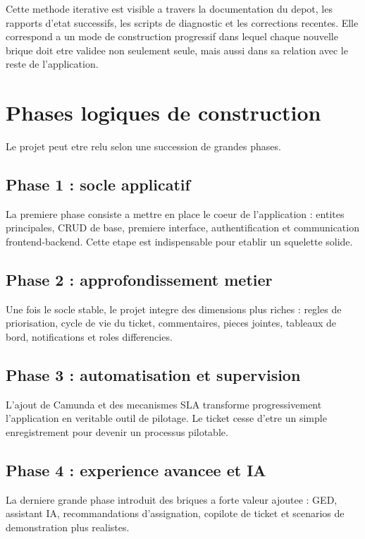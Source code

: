 \documentclass[12pt,a4paper,oneside]{report}
\begin{document}
Cette methode iterative est visible a travers la documentation du depot, les rapports d'etat successifs, les scripts de diagnostic et les corrections recentes. Elle correspond a un mode de construction progressif dans lequel chaque nouvelle brique doit etre validee non seulement seule, mais aussi dans sa relation avec le reste de l'application.

\section{Phases logiques de construction}

Le projet peut etre relu selon une succession de grandes phases.

\subsection{Phase 1 : socle applicatif}

La premiere phase consiste a mettre en place le coeur de l'application : entites principales, CRUD de base, premiere interface, authentification et communication frontend-backend. Cette etape est indispensable pour etablir un squelette solide.

\subsection{Phase 2 : approfondissement metier}

Une fois le socle stable, le projet integre des dimensions plus riches : regles de priorisation, cycle de vie du ticket, commentaires, pieces jointes, tableaux de bord, notifications et roles differencies.

\subsection{Phase 3 : automatisation et supervision}

L'ajout de Camunda et des mecanismes SLA transforme progressivement l'application en veritable outil de pilotage. Le ticket cesse d'etre un simple enregistrement pour devenir un processus pilotable.

\subsection{Phase 4 : experience avancee et IA}

La derniere grande phase introduit des briques a forte valeur ajoutee : GED, assistant IA, recommandations d'assignation, copilote de ticket et scenarios de demonstration plus realistes.
\end{document}
